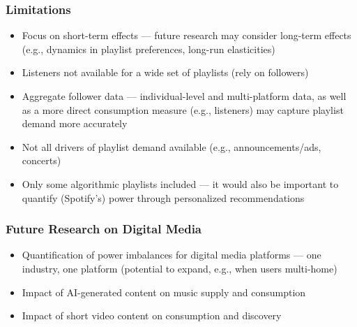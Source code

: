\documentclass[8pt]{beamer}
\begin{document}
\begin{frame}

\frametitle{Limitations}

\begin{itemize} 

    \item Focus on short-term effects --- future research may consider long-term effects (e.g., dynamics in playlist preferences, long-run elasticities)
    \item Listeners not available for a wide set of playlists (rely on followers)
    \item Aggregate follower data --- individual-level and multi-platform data, as well as a more direct consumption measure (e.g., listeners) may capture playlist demand more accurately
    \item Not all drivers of playlist demand available (e.g., announcements/ads, concerts)
    \item Only some algorithmic playlists included --- it would also be important to quantify (Spotify's) power through personalized recommendations
\end{itemize}	

\end{frame}

\begin{frame}

\frametitle{Future Research on Digital Media}

\begin{itemize}
    \item Quantification of power imbalances for digital media platforms --- one industry, one platform (potential to expand, e.g., when users multi-home)    
     
    \item Impact of AI-generated content on music supply and consumption

    \item Impact of short video content on consumption and discovery
    
\end{itemize}


\end{frame}
\end{document}
